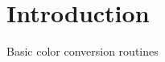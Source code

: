     

    \hypertarget{index_Introduction}{}\section{Introduction}\label{index_Introduction}
Basic color conversion routines

      